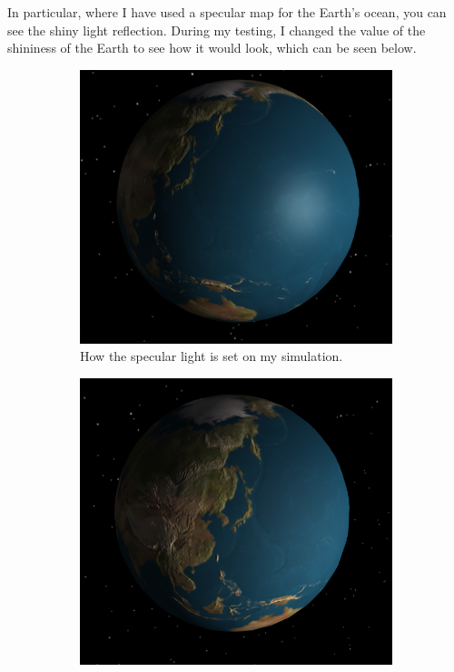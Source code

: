 \documentclass[12pt]{article}
\begin{document}
In particular, where I have used a specular map for the Earth's ocean, you can see the shiny light reflection. During my testing, I changed the value of the shininess of the Earth to see how it would look, which can be seen below.

 \begin{figure}[H]
        \centering
        \begin{subfigure}[b]{0.4\textwidth}
                \includegraphics[width=\textwidth]{images/specular1}
                \caption{How the specular light is set on my simulation.}
                \label{fig:Specular 1.}
	 \end{subfigure}
        \begin{subfigure}[b]{0.4\textwidth}
                \includegraphics[width=\textwidth]{images/specular2}

\end{subfigure}
\end{figure}
\end{document}
